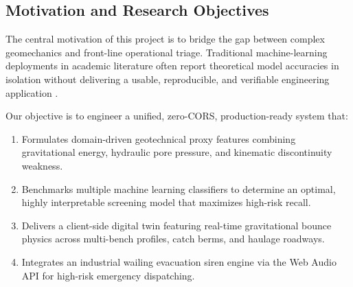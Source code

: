 \documentclass[conference]{IEEEtran}
\begin{document}
\subsection{Motivation and Research Objectives}
The central motivation of this project is to bridge the gap between complex geomechanics and front-line operational triage. Traditional machine-learning deployments in academic literature often report theoretical model accuracies in isolation without delivering a usable, reproducible, and verifiable engineering application \cite{barbedo2016review}. 

Our objective is to engineer a unified, zero-CORS, production-ready system that:
\begin{enumerate}
    \item Formulates domain-driven geotechnical proxy features combining gravitational energy, hydraulic pore pressure, and kinematic discontinuity weakness.
    \item Benchmarks multiple machine learning classifiers to determine an optimal, highly interpretable screening model that maximizes high-risk recall.
    \item Delivers a client-side digital twin featuring real-time gravitational bounce physics across multi-bench profiles, catch berms, and haulage roadways.
    \item Integrates an industrial wailing evacuation siren engine via the Web Audio API for high-risk emergency dispatching.
\end{enumerate}
\end{document}
